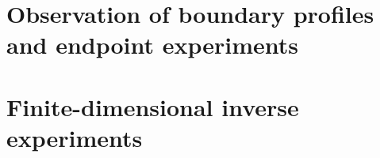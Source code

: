 \part{Observation of boundary profiles and endpoint experiments}






\part{Finite-dimensional inverse experiments}









